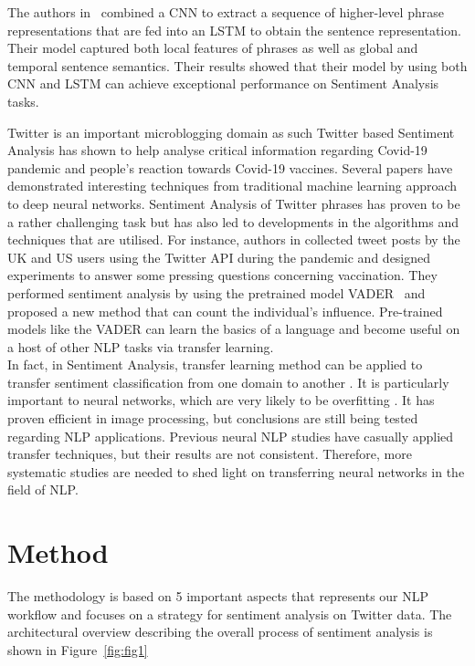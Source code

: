\documentclass[conference]{IEEEtran}
\begin{document}
The authors in~\cite{zhou2015c}  combined  a CNN to extract a sequence of higher-level phrase representations that are fed into an LSTM to obtain the sentence representation. Their model captured both local features of phrases as well as global and temporal sentence semantics. Their results showed that their model by using both CNN and LSTM can achieve exceptional performance on Sentiment Analysis tasks.



Twitter is an important microblogging domain as such Twitter based Sentiment Analysis has shown to help analyse critical information regarding Covid-19 pandemic and people’s reaction towards Covid-19 vaccines. Several papers have demonstrated interesting techniques from traditional machine learning approach to deep neural networks. Sentiment Analysis of Twitter phrases has proven to be a rather challenging task but has also led to developments in the algorithms and techniques that are utilised. For instance, authors in \cite{na2021insight} collected tweet posts by the UK and US users using the Twitter API during the pandemic and designed experiments to answer some pressing questions concerning vaccination. They performed sentiment analysis by using the pretrained model VADER~\cite{hutto2014vader} and proposed a new method that can count the individual’s influence. Pre-trained models like the VADER can learn the basics of a language and become useful on a host of other NLP tasks via transfer learning. \\
In fact, in Sentiment Analysis, transfer learning method can be applied to transfer sentiment classification from one domain to another \cite{tan2011weighted}. It is particularly important to neural networks, which are very likely to be overfitting \cite{mou2016transferable}. It has proven efficient in image processing, but conclusions are still being tested regarding NLP applications. Previous neural NLP studies have casually applied transfer techniques, but their results are not consistent. Therefore, more systematic studies are needed to shed light on transferring neural networks in the field of NLP.




\section{Method} \label{sec:method}

The methodology is based on 5 important aspects that represents our NLP workflow and focuses on a strategy for sentiment analysis on Twitter data. The architectural overview describing the overall process of sentiment analysis is shown in Figure~\ref{fig:fig1}
\end{document}
